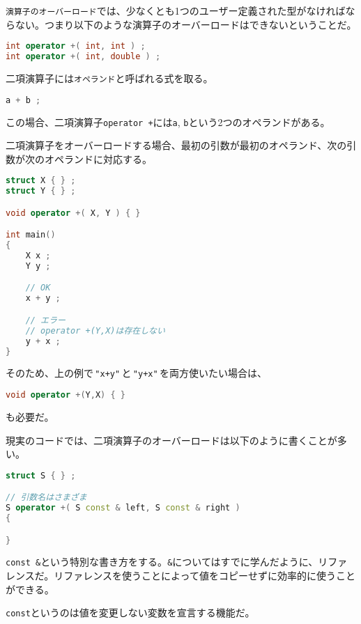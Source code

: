 \texttt{演算子のオーバーロード}では、少なくとも1つのユーザー定義された型がなければならない。つまり以下のような演算子のオーバーロードはできないということだ。

\begin{lstlisting}[language={C++}]
int operator +( int, int ) ;
int operator +( int, double ) ;
\end{lstlisting}

二項演算子には\texttt{オペランド}と呼ばれる式を取る。

\begin{lstlisting}[language={C++}]
a + b ;
\end{lstlisting}

この場合、二項演算子\texttt{operator +}には\texttt{a}, \texttt{b}という2つのオペランドがある。

二項演算子をオーバーロードする場合、最初の引数が最初のオペランド、次の引数が次のオペランドに対応する。

\begin{lstlisting}[language={C++}]
struct X { } ;
struct Y { } ;

void operator +( X, Y ) { }

int main()
{
    X x ;
    Y y ;

    // OK
    x + y ;

    // エラー
    // operator +(Y,X)は存在しない
    y + x ;
}
\end{lstlisting}

そのため、上の例で\,\texttt{"x+y"}\,と\,\texttt{"y+x"}\,を両方使いたい場合は、
\begin{lstlisting}[language={C++}]
void operator +(Y,X) { }
\end{lstlisting}
も必要だ。

\ifTombow\pagebreak\fi
現実のコードでは、二項演算子のオーバーロードは以下のように書くことが多い。

\begin{lstlisting}[language={C++}]
struct S { } ;

// 引数名はさまざま
S operator +( S const & left, S const & right )
{

}
\end{lstlisting}

\texttt{const \&}という特別な書き方をする。\texttt{\&}についてはすでに学んだように、リファレンスだ。リファレンスを使うことによって値をコピーせずに効率的に使うことができる。

\texttt{const}というのは値を変更しない変数を宣言する機能だ。

